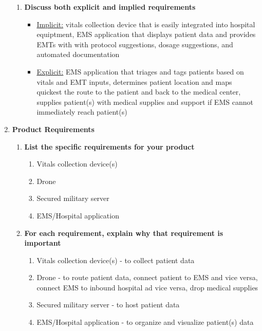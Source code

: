 \documentclass[man]{article}
\begin{document}
\begin{enumerate}
\begin{enumerate}
          \item \textbf{Discuss both explicit and implied requirements}
            \begin{itemize}
              \item \underline{Implicit:} vitals collection device that is easily integrated into hospital equiptment, EMS application that displays patient data and provides EMTs with with protocol suggestions, dosage suggestions, and automated documentation
              \item \underline{Explicit:} EMS application that triages and tags patients based on vitals and EMT inputs, determines patient location and maps quickest the route to the patient and back to the medical center, supplies patient(s) with medical supplies and support if EMS cannot immediately reach patient(s)
            \end{itemize}
        \end{enumerate}
        \newpage

      \item \textbf{Product Requirements}
        \begin{enumerate}
          \item \textbf{List the specific requirements for your product}
            \begin{enumerate}
              \item Vitals collection device(s)
              \item Drone
              \item Secured military server
              \item EMS/Hospital application
            \end{enumerate}

          \item \textbf{For each requirement, explain why that requirement is important}
            \begin{enumerate}
              \item Vitals collection device(s) - to collect patient data
              \item Drone - to route patient data, connect patient to EMS and vice versa, connect EMS to inbound hospital ad vice versa, drop medical supplies
              \item Secured military server - to host patient data
              \item EMS/Hospital application - to organize and visualize patient(s) data
            \end{enumerate}


\end{enumerate}
\end{enumerate}
\end{document}
